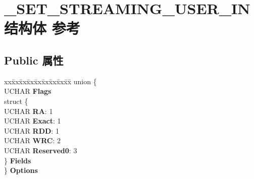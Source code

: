 \hypertarget{struct___s_e_t___s_t_r_e_a_m_i_n_g___u_s_e_r___i_n}{}\section{\+\_\+\+S\+E\+T\+\_\+\+S\+T\+R\+E\+A\+M\+I\+N\+G\+\_\+\+U\+S\+E\+R\+\_\+\+I\+N结构体 参考}
\label{struct___s_e_t___s_t_r_e_a_m_i_n_g___u_s_e_r___i_n}
\subsection*{Public 属性}
\begin{DoxyCompactItemize}
\item 
\mbox{\label{struct___s_e_t___s_t_r_e_a_m_i_n_g___u_s_e_r___i_n_aa5cdf7a6768ebc17285bec78cae03250}} 
\begin{tabbing}
xx\=xx\=xx\=xx\=xx\=xx\=xx\=xx\=xx\=\kill
union \{\\
\>UCHAR {\bfseries Flags}\\
\>struct \{\\
\>\>UCHAR {\bfseries RA}: 1\\
\>\>UCHAR {\bfseries Exact}: 1\\
\>\>UCHAR {\bfseries RDD}: 1\\
\>\>UCHAR {\bfseries WRC}: 2\\
\>\>UCHAR {\bfseries Reserved0}: 3\\
\>\} {\bfseries Fields}\\
\} {\bfseries Options}\\


\end{tabbing}
\end{DoxyCompactItemize}

